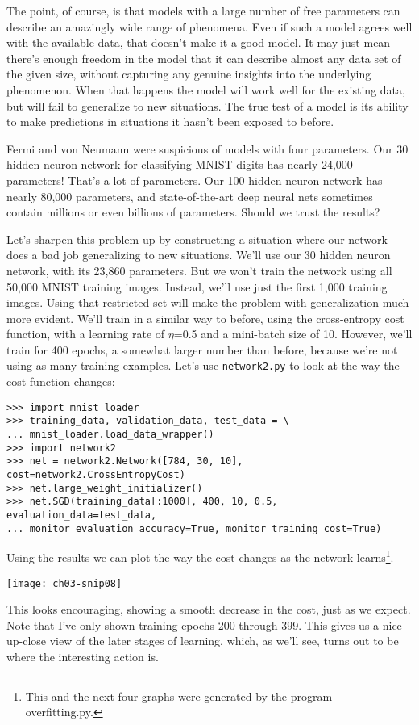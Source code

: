 The point, of course, is that models with a large number of free parameters can describe an amazingly wide range of phenomena. Even if such a model agrees well with the available data, that doesn't make it a good model. It may just mean there's enough freedom in the model that it can describe almost any data set of the given size, without capturing any genuine insights into the underlying phenomenon. When that happens the model will work well for the existing data, but will fail to generalize to new situations. The true test of a model is its ability to make predictions in situations it hasn't been exposed to before.

Fermi and von Neumann were suspicious of models with four parameters. Our 30 hidden neuron network for classifying MNIST digits has nearly 24,000 parameters! That's a lot of parameters. Our 100 hidden neuron network has nearly 80,000 parameters, and state-of-the-art deep neural nets sometimes contain millions or even billions of parameters. Should we trust the results?

Let's sharpen this problem up by constructing a situation where our network does a bad job generalizing to new situations. We'll use our 30 hidden neuron network, with its 23,860 parameters. But we won't train the network using all 50,000 MNIST training images. Instead, we'll use just the first 1,000 training images. Using that restricted set will make the problem with generalization much more evident. We'll train in a similar way to before, using the cross-entropy cost function, with a learning rate of $\eta$=0.5 and a mini-batch size of 10. However, we'll train for 400 epochs, a somewhat larger number than before, because we're not using as many training examples. Let's use \lstinline{network2.py} to look at the way the cost function changes:

 
\begin{lstlisting}
>>> import mnist_loader 
>>> training_data, validation_data, test_data = \
... mnist_loader.load_data_wrapper()
>>> import network2 
>>> net = network2.Network([784, 30, 10], cost=network2.CrossEntropyCost) 
>>> net.large_weight_initializer()
>>> net.SGD(training_data[:1000], 400, 10, 0.5, evaluation_data=test_data,
... monitor_evaluation_accuracy=True, monitor_training_cost=True)
\end{lstlisting}
Using the results we can plot the way the cost changes as the network learns\footnote{This and the next four graphs were generated by the program overfitting.py.}.
\begin{marginfigure}
\texttt{[image: ch03-snip08]}
\end{marginfigure}
This looks encouraging, showing a smooth decrease in the cost, just as we expect. Note that I've only shown training epochs 200 through 399. This gives us a nice up-close view of the later stages of learning, which, as we'll see, turns out to be where the interesting action is.

